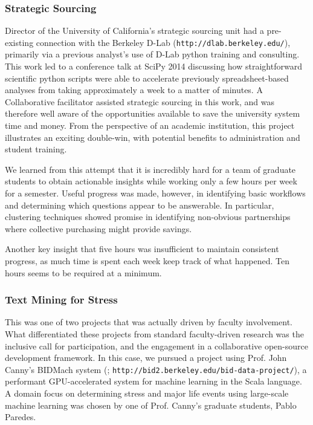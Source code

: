 \documentclass{sig-alternate}
\begin{document}
\subsubsection*{Strategic Sourcing}

Director of the University of California's strategic sourcing unit had a pre-existing connection with the Berkeley D-Lab (\texttt{http://dlab.berkeley.edu/}), primarily via a previous analyst's use of D-Lab python training and consulting. This work led to a conference talk at SciPy 2014 discussing how straightforward scientific python scripts were able to accelerate previously spreadsheet-based analyses from taking approximately a week to a matter of minutes. A Collaborative facilitator assisted strategic sourcing in this work, and was therefore well aware of the opportunities available to save the university system time and money. From the perspective of an academic institution, this project illustrates an exciting double-win, with potential benefits to administration and student training. 

We learned from this attempt that it is incredibly hard for a team of graduate students to obtain actionable insights while working only a few hours per week for a semester. Useful progress was made, however, in identifying basic workflows and determining which questions appear to be answerable. In particular, clustering techniques showed promise in identifying non-obvious partnerships where collective purchasing might provide savings.

Another key insight that five hours was insufficient to maintain consistent progress, as much time is spent each week keep track of what happened. Ten hours seems to be required at a minimum. 


\subsubsection*{Text Mining for Stress}

This was one of two projects that was actually driven by faculty involvement. What differentiated these projects from standard faculty-driven research was the inclusive call for participation, and the engagement in a collaborative open-source development framework. In this case, we pursued a project using Prof. John Canny's BIDMach system (\cite{canny2013bidmach}; \texttt{http://bid2.berkeley.edu/bid-data-project/}), a performant GPU-accelerated system for machine learning in the Scala language. A domain focus on determining stress and major life events using large-scale machine learning was chosen by one of Prof. Canny's graduate students, Pablo Paredes.
\end{document}
